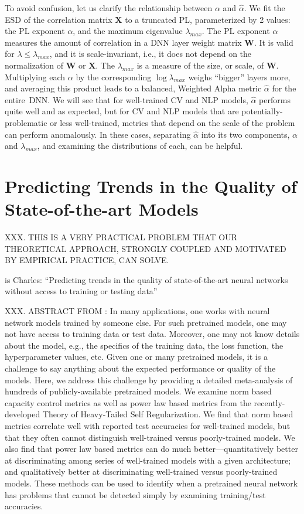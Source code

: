\documentclass{article}
\begin{document}
To avoid confusion, let us clarify the relationship between $\alpha$ and $\hat{\alpha}$.  
We fit the ESD of the correlation matrix $\mathbf{X}$ to a truncated PL, parameterized by 2 values: the PL exponent $\alpha$, and the maximum eigenvalue $\lambda_{max}$.
The PL exponent $\alpha$ measures the amount of correlation in a DNN layer weight matrix $\mathbf{W}$. 
It is valid for $\lambda\le\lambda_{max}$, and it is scale-invariant, i.e., it does not depend on the normalization of $\mathbf{W}$ or $\mathbf{X}$.
The $\lambda_{max}$ is a measure of the size, or scale, of $\mathbf{W}$.
Multiplying each $\alpha$ by the corresponding $\log\lambda_{max}$ weighs ``bigger'' layers more, and averaging this product leads to a balanced, Weighted Alpha metric $\hat{\alpha}$ for the entire~DNN.
We will see that for well-trained CV and NLP models, $\hat{\alpha}$ performs quite well and as expected, but for CV and NLP models that are potentially-problematic or less well-trained, metrics that depend on the scale of the problem can perform anomalously.  
In these cases, separating $\hat{\alpha}$ into its two components, $\alpha$ and $\lambda_{max}$, and examining the distributions of each, can be helpful.



\section{Predicting Trends in the Quality of State-of-the-art Models}

XXX.  THIS IS A VERY PRACTICAL PROBLEM THAT OUR THEORETICAL APPROACH, STRONGLY COUPLED AND MOTIVATED BY EMPIRICAL PRACTICE, CAN SOLVE.

\cite{MM20a_trends_TR} is Charles: ``Predicting trends in the quality of state-of-the-art neural networks without access to training or testing data''

XXX.  ABSTRACT FROM \cite{MM20a_trends_TR}:
In many applications, one works with neural network models trained by someone else.
For such pretrained models, one may not have access to training data or test data.
Moreover, one may not know details about the model, e.g., the specifics of the training data, the loss function, the hyperparameter values, etc.
Given one or many pretrained models, it is a challenge to say anything about the expected performance or quality of the models.
Here, we address this challenge by providing a detailed meta-analysis of hundreds of publicly-available pretrained models.
We examine norm based capacity control metrics as well as power law based metrics from the recently-developed Theory of Heavy-Tailed Self Regularization.
We find that norm based metrics correlate well with reported test accuracies for well-trained models, but that they often cannot distinguish well-trained versus poorly-trained models.
We also find that power law based metrics can do much better---quantitatively better at discriminating among series of well-trained models with a given architecture; and qualitatively better at discriminating well-trained versus poorly-trained models.
These methods can be used to identify when a pretrained neural network has problems that cannot be detected simply by examining training/test accuracies.
\end{document}
